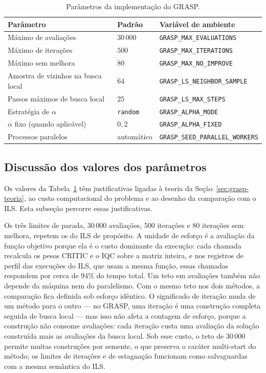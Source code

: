 \documentclass[11pt,a4paper]{article}
\newcommand{\code}[1]{\texttt{#1}}
\begin{document}
\begin{table}[h]
\centering
\caption{Parâmetros da implementação do GRASP.}
\label{tab:parametros}
\begin{tabular}{@{}lll@{}}
\toprule
Parâmetro & Padrão & Variável de ambiente \\
\midrule
Máximo de avaliações & $30\,000$ & \code{GRASP\_MAX\_EVALUATIONS} \\
Máximo de iterações & $500$ & \code{GRASP\_MAX\_ITERATIONS} \\
Máximo sem melhora & $80$ & \code{GRASP\_MAX\_NO\_IMPROVE} \\
Amostra de vizinhos na busca local & $64$ & \code{GRASP\_LS\_NEIGHBOR\_SAMPLE} \\
Passos máximos de busca local & $25$ & \code{GRASP\_LS\_MAX\_STEPS} \\
Estratégia de $\alpha$ & \code{random} & \code{GRASP\_ALPHA\_MODE} \\
$\alpha$ fixo (quando aplicável) & $0{,}2$ & \code{GRASP\_ALPHA\_FIXED} \\
Processos paralelos & automático & \code{GRASP\_SEED\_PARALLEL\_WORKERS} \\
\bottomrule
\end{tabular}
\end{table}

\subsection{Discussão dos valores dos parâmetros}
\label{sec:grasp-parametros}

Os valores da Tabela~\ref{tab:parametros} têm justificativas ligadas à teoria da Seção~\ref{sec:grasp-teoria}, ao custo computacional do problema e ao desenho da comparação com o ILS. Esta subseção percorre essas justificativas.

Os três limites de parada, $30\,000$ avaliações, $500$ iterações e $80$ iterações sem melhora, repetem os do ILS de propósito. A unidade de esforço é a avaliação da função objetivo porque ela é o custo dominante da execução: cada chamada recalcula os pesos CRITIC e o IQC sobre a matriz inteira, e nos registros de perfil das execuções do ILS, que usam a mesma função, essas chamadas respondem por cerca de $94\%$ do tempo total. Um teto em avaliações também não depende da máquina nem do paralelismo. Com o mesmo teto nos dois métodos, a comparação fica definida sob esforço idêntico. O significado de iteração muda de um método para o outro — no GRASP, uma iteração é uma construção completa seguida de busca local — mas isso não afeta a contagem de esforço, porque a construção não consome avaliações: cada iteração custa uma avaliação da solução construída mais as avaliações da busca local. Sob esse custo, o teto de $30\,000$ permite muitas construções por semente, o que preserva o caráter multi-start do método; os limites de iterações e de estagnação funcionam como salvaguardas com a mesma semântica do ILS.
\end{document}
